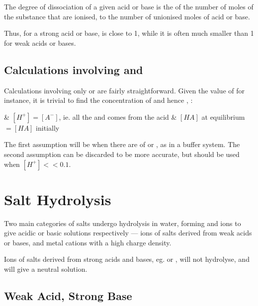 			The degree of dissociation of a given acid or base is the  of the number of moles of the substance that are ionised, to
			the number of unionised moles of acid or base.


			Thus, for a strong acid or base, \chemalpha is close to \num{1}, while it is often much smaller than \num{1} for weak acids or bases.



		\subsection{Calculations involving \MKa{} and \MKb{}}

			Calculations involving only \Ka{} or \Kb{} are fairly straightforward. Given the value of \Ka{} for instance, it is trivial
			to find the concentration of  and hence \pH{}, :

			\begin{bulletlist}
				& $[H^{+}] = [A^{-}]$, ie. all the  and  comes from the acid
				& $[HA]$ at equilibrium $ = [HA]$ initially
			\end{bulletlist}

			The first assumption will be  when there are  of  or , as in a buffer
			system. The second assumption can be discarded to be more accurate, but should be used when $[H^{+}] << 0.1$.



	\pagebreak
	\section{Salt Hydrolysis}

		Two main categories of salts undergo hydrolysis in water, forming  and  ions to give acidic or basic solutions
		respectively --- ions of salts derived from weak acids or bases, and metal cations with a high charge density.

		Ions of salts derived from strong acids and bases, eg.  or , will not hydrolyse, and will give a neutral solution.


		\subsection{Weak Acid, Strong Base}

